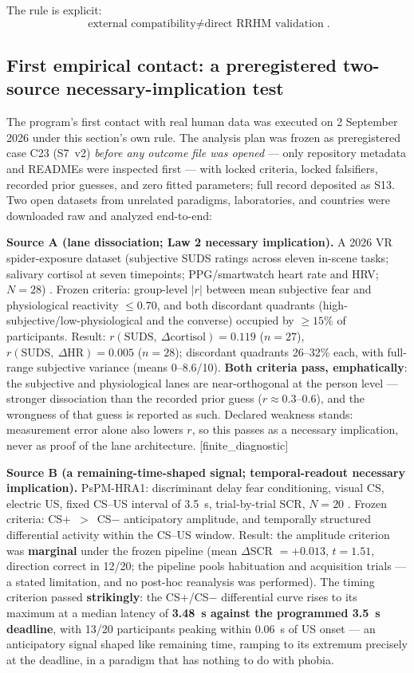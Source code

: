 \documentclass[9pt,twocolumn]{article}
\newcommand{\tier}[1]{{\sffamily\scriptsize\color{RRHMSlate}[#1]}}
\begin{document}
The rule is explicit:
\[
\boxed{\text{external compatibility}\neq\text{direct RRHM validation}}.
\]

\subsection{First empirical contact: a preregistered two-source necessary-implication test}
\label{sec:firstcontact}
The program's first contact with real human data was executed on 2 September 2026 under this section's own rule. The analysis plan was frozen as preregistered case C23 (S7~v2) \emph{before any outcome file was opened} --- only repository metadata and READMEs were inspected first --- with locked criteria, locked falsifiers, recorded prior guesses, and zero fitted parameters; full record deposited as S13. Two open datasets from unrelated paradigms, laboratories, and countries were downloaded raw and analyzed end-to-end:

\textbf{Source A (lane dissociation; Law 2 necessary implication).} A 2026 VR spider-exposure dataset (subjective SUDS ratings across eleven in-scene tasks; salivary cortisol at seven timepoints; PPG/smartwatch heart rate and HRV; $N{=}28$) \cite{vrspider2026}. Frozen criteria: group-level $|r|$ between mean subjective fear and physiological reactivity $\le0.70$, and both discordant quadrants (high-subjective/low-physiological and the converse) occupied by $\ge15\%$ of participants. Result: $r(\mathrm{SUDS},\ \Delta\mathrm{cortisol})=0.119$ ($n{=}27$), $r(\mathrm{SUDS},\ \Delta\mathrm{HR})=0.005$ ($n{=}28$); discordant quadrants 26--32\% each, with full-range subjective variance (means 0--8.6/10). \textbf{Both criteria pass, emphatically}: the subjective and physiological lanes are near-orthogonal at the person level --- stronger dissociation than the recorded prior guess ($r\approx0.3$--$0.6$), and the wrongness of that guess is reported as such. Declared weakness stands: measurement error alone also lowers $r$, so this passes as a necessary implication, never as proof of the lane architecture. \tier{finite\_diagnostic}

\textbf{Source B (a remaining-time-shaped signal; temporal-readout necessary implication).} PsPM-HRA1: discriminant delay fear conditioning, visual CS, electric US, fixed CS--US interval of 3.5~s, trial-by-trial SCR, $N{=}20$ \cite{hra1data}. Frozen criteria: CS$+$~$>$~CS$-$ anticipatory amplitude, and temporally structured differential activity within the CS--US window. Result: the amplitude criterion was \textbf{marginal} under the frozen pipeline (mean $\Delta$SCR $=+0.013$, $t=1.51$, direction correct in 12/20; the pipeline pools habituation and acquisition trials --- a stated limitation, and no post-hoc reanalysis was performed). The timing criterion passed \textbf{strikingly}: the CS$+$/CS$-$ differential curve rises to its maximum at a median latency of \textbf{3.48~s against the programmed 3.5~s deadline}, with 13/20 participants peaking within 0.06~s of US onset --- an anticipatory signal shaped like remaining time, ramping to its extremum precisely at the deadline, in a paradigm that has nothing to do with phobia.
\end{document}
